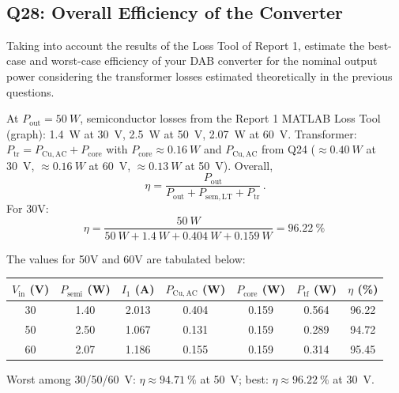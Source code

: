 \documentclass{PELsmallreport}
\begin{document}
\hfill{}\\








\subsection{Q28: Overall Efficiency of the Converter}  
Taking into account the results of the Loss Tool of Report 1, estimate the best-case and worst-case efficiency of your DAB converter for the nominal output power considering the transformer losses estimated theoretically in the previous questions. 

\begin{framed}
	\vspace{2em}
At $P_{\mathrm{out}}=\SI{50}{W}$, semiconductor losses from the Report 1 MATLAB Loss Tool (graph): \SI{1.4}{W} at \SI{30}{V}, \SI{2.5}{W} at \SI{50}{V}, \SI{2.07}{W} at \SI{60}{V}. Transformer: $P_{\mathrm{tr}}=P_{\mathrm{Cu,AC}}+P_{\mathrm{core}}$ with $P_{\mathrm{core}}\approx\SI{0.16}{W}$ and $P_{\mathrm{Cu,AC}}$ from Q24 ($\approx\SI{0.40}{W}$ at \SI{30}{V}, $\approx\SI{0.16}{W}$ at \SI{60}{V}, $\approx\SI{0.13}{W}$ at \SI{50}{V}). Overall,
\begin{equation}
  \eta=\frac{P_{\mathrm{out}}}{P_{\mathrm{out}}+P_{\mathrm{sem,LT}}+P_{\mathrm{tr}}}\,.
\end{equation}
For 30V:
\begin{equation}
  \eta = \frac{\SI{50}{W}}{\SI{50}{W}+\SI{1.4}{W}+\SI{0.404}{W}+\SI{0.159}{W}} = \SI{96.22}{\percent}\
  \end{equation}

The values for 50V and 60V are tabulated below:


\begin{center}\begin{tabular}{ccccccc}\toprule
$V_\mathrm{in}$ (V) & $P_\mathrm{semi}$ (W) & $I_1$ (A) & $P_\mathrm{Cu,AC}$ (W) & $P_\mathrm{core}$ (W) & $P_\mathrm{tf}$ (W) & $\eta$ (\%) \\\midrule
30 & 1.40 & 2.013 & 0.404 & 0.159 & 0.564 & 96.22 \\
50 & 2.50 & 1.067 & 0.131 & 0.159 & 0.289 & 94.72 \\
60 & 2.07 & 1.186 & 0.155 & 0.159 & 0.314 & 95.45 \\\bottomrule
\end{tabular}\end{center}

Worst among \SI{30}{}/\SI{50}{}/\SI{60}{V}: $\eta\approx\SI{94.71}{\percent}$ at \SI{50}{V}; best: $\eta\approx\SI{96.22}{\percent}$ at \SI{30}{V}.

	\vspace{2em}
\end{framed}
\end{document}
